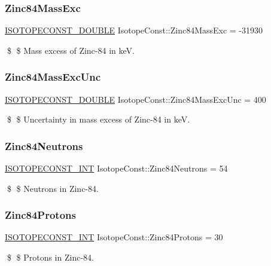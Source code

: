 \subsubsection{\texorpdfstring{Zinc84\+Mass\+Exc}{Zinc84MassExc}}
{\footnotesize\ttfamily \mbox{\hyperlink{group___isotope_const-_macros_ga8f45a7272ce02c0b4c65c44636ed719a}{I\+S\+O\+T\+O\+P\+E\+C\+O\+N\+S\+T\+\_\+\+D\+O\+U\+B\+LE}} Isotope\+Const\+::\+Zinc84\+Mass\+Exc = -\/31930}

\$ \$ Mass excess of Zinc-\/84 in keV. \mbox{\label{group___isotope_const-_zinc-_zn84_ga2594ca3e561b26b1667634a8b5734300}} 
\subsubsection{\texorpdfstring{Zinc84\+Mass\+Exc\+Unc}{Zinc84MassExcUnc}}
{\footnotesize\ttfamily \mbox{\hyperlink{group___isotope_const-_macros_ga8f45a7272ce02c0b4c65c44636ed719a}{I\+S\+O\+T\+O\+P\+E\+C\+O\+N\+S\+T\+\_\+\+D\+O\+U\+B\+LE}} Isotope\+Const\+::\+Zinc84\+Mass\+Exc\+Unc = 400}

\$ \$ Uncertainty in mass excess of Zinc-\/84 in keV. \mbox{\label{group___isotope_const-_zinc-_zn84_ga0c86aaff20c04f37adf5a5ee9350a7f7}} 
\subsubsection{\texorpdfstring{Zinc84\+Neutrons}{Zinc84Neutrons}}
{\footnotesize\ttfamily \mbox{\hyperlink{group___isotope_const-_macros_ga5f18360b3e99483a35c32d789e62621c}{I\+S\+O\+T\+O\+P\+E\+C\+O\+N\+S\+T\+\_\+\+I\+NT}} Isotope\+Const\+::\+Zinc84\+Neutrons = 54}

\$ \$ Neutrons in Zinc-\/84. \mbox{\label{group___isotope_const-_zinc-_zn84_ga2431446972039726c6bc023f29f36516}} 
\subsubsection{\texorpdfstring{Zinc84\+Protons}{Zinc84Protons}}
{\footnotesize\ttfamily \mbox{\hyperlink{group___isotope_const-_macros_ga5f18360b3e99483a35c32d789e62621c}{I\+S\+O\+T\+O\+P\+E\+C\+O\+N\+S\+T\+\_\+\+I\+NT}} Isotope\+Const\+::\+Zinc84\+Protons = 30}

\$ \$ Protons in Zinc-\/84. 